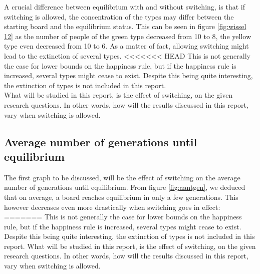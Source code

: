 A crucial difference between equilibrium with and without switching, is that if switching is allowed, the concentration of the types may differ between the starting board and the equilibrium status. 
This can be seen in figure \ref{fig:wissel 12} as the number of people of the green type decreased from 10 to 8, the yellow type even decreased from 10 to 6. 
As a matter of fact, allowing switching might lead to the extinction of several types. 
<<<<<<< HEAD
This is not generally the case for lower bounds on the happiness rule, but if the happiness rule is increased, several types might cease to exist. Despite this being quite interesting, the extinction of types is not included in this report.\\
What will be studied in this report, is the effect of switching, on the given research questions. In other words, how will the results discussed in this report, vary when switching is allowed. 
\newpage

\subsection{Average number of generations until equilibrium}
The first graph to be discussed, will be the effect of switching on the average number of generations until equilibrium. From figure \ref{fig:aantgen}, we deduced that on average, a board reaches equilibrium in only a few generations. This however decreases even more drastically when switching goes in effect:
=======
This is not generally the case for lower bounds on the happiness rule, but if the happiness rule is increased, several types might cease to exist. Despite this being quite interesting, the extinction of types is not included in this report. What will be studied in this report, is the effect of switching, on the given research questions. In other words, how will the results discussed in this report, vary when switching is allowed. 
\newpage


